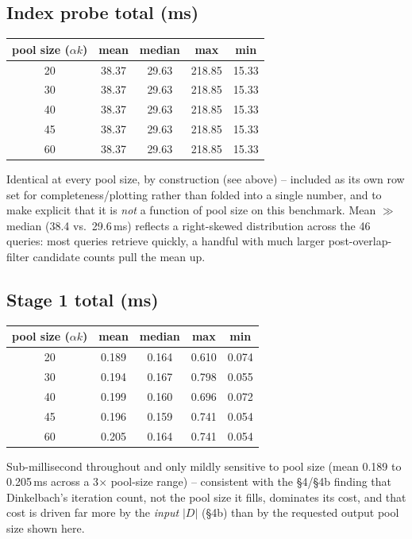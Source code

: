 \subsection{Index probe total (ms)}
\begin{center}
\begin{tabular}{ccccc}
\toprule
pool size ($\alpha k$) & mean & median & max & min \\
\midrule
20 & 38.37 & 29.63 & 218.85 & 15.33 \\
30 & 38.37 & 29.63 & 218.85 & 15.33 \\
40 & 38.37 & 29.63 & 218.85 & 15.33 \\
45 & 38.37 & 29.63 & 218.85 & 15.33 \\
60 & 38.37 & 29.63 & 218.85 & 15.33 \\
\bottomrule
\end{tabular}
\end{center}
Identical at every pool size, by construction (see above) -- included as its own
row set for completeness/plotting rather than folded into a single number, and to
make explicit that it is \emph{not} a function of pool size on this benchmark.
Mean $\gg$ median (38.4 vs.\ 29.6\,ms) reflects a right-skewed distribution across
the 46 queries: most queries retrieve quickly, a handful with much larger
post-overlap-filter candidate counts pull the mean up.

\subsection{Stage 1 total (ms)}
\begin{center}
\begin{tabular}{ccccc}
\toprule
pool size ($\alpha k$) & mean & median & max & min \\
\midrule
20 & 0.189 & 0.164 & 0.610 & 0.074 \\
30 & 0.194 & 0.167 & 0.798 & 0.055 \\
40 & 0.199 & 0.160 & 0.696 & 0.072 \\
45 & 0.196 & 0.159 & 0.741 & 0.054 \\
60 & 0.205 & 0.164 & 0.741 & 0.054 \\
\bottomrule
\end{tabular}
\end{center}
Sub-millisecond throughout and only mildly sensitive to pool size (mean 0.189 to
0.205\,ms across a 3$\times$ pool-size range) -- consistent with the
\S4/\S4b finding that Dinkelbach's iteration count, not the pool size it fills,
dominates its cost, and that cost is driven far more by the \emph{input} $|D|$
(\S4b) than by the requested output pool size shown here.

